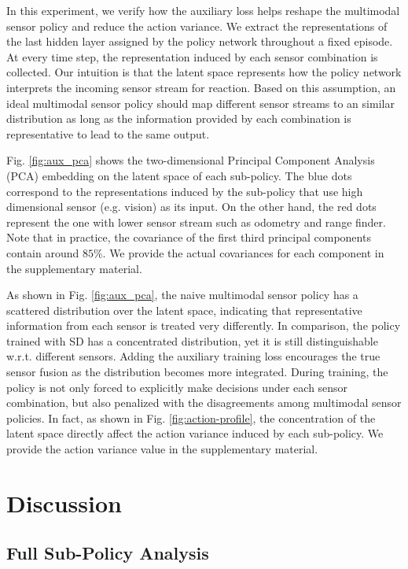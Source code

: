 \documentclass[../thesis.tex]{subfiles}
\begin{document}
In this experiment, we verify how the auxiliary loss helps reshape the multimodal sensor policy and reduce the action variance.
We extract the representations of the last hidden layer assigned by the policy network throughout a fixed episode. At every time step, the representation induced by each sensor combination is collected.
Our intuition is that the latent space represents how the policy network interprets the incoming sensor stream for reaction. Based on this assumption, an ideal multimodal sensor policy should map different sensor streams to an similar distribution as long as the information provided by each combination is representative to lead to the same output.
 
Fig. \ref{fig:aux_pca} shows the two-dimensional Principal Component Analysis (PCA) embedding on the latent space of each sub-policy. The blue dots correspond to the representations induced by the sub-policy that use high dimensional sensor (e.g. vision) as its input. On the other hand, the red dots represent the one with lower sensor stream such as odometry and range finder. Note that in practice, the covariance of the first third principal components contain around $85\%$. We provide the actual covariances for each component in the supplementary material.
 
As shown in Fig. \ref{fig:aux_pca}, the naive multimodal sensor policy has a scattered distribution over the latent space, indicating that representative information from each sensor is treated very differently. In comparison, the policy trained with SD has a concentrated distribution, yet it is still distinguishable w.r.t. different sensors. Adding the auxiliary training loss encourages the true sensor fusion as the distribution becomes more integrated. During training, the policy is not only forced to explicitly make decisions under each sensor combination, but also penalized with the disagreements among multimodal sensor policies. In fact, as shown in Fig. \ref{fig:action-profile}, the concentration of the latent space directly affect the action variance induced by each sub-policy. We provide the action variance value in the supplementary material.
 
 
\section{Discussion} \label{sec:mdrl-discussion}
 
 
\subsection{Full Sub-Policy Analysis}
\label{SD-full-config}
 
\end{document}
